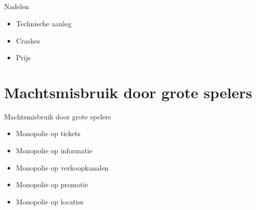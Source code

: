 \documentclass{beamer}
\begin{document}
    \subsection{}
    \begin{frame}{Nadelen}
        \begin{itemize}
            \item Technische aanleg
            \item Crashes
            \item Prijs
        \end{itemize}
    \end{frame}
    
    
    
    

    
\section[Machtsmisbruik]{Machtsmisbruik door grote spelers}
\begin{frame}{Machtsmisbruik door grote spelers}
    \begin{itemize}
        \item Monopolie op tickets
        \item Monopolie op informatie
        \item Monopolie op verkoopkanalen
        \item Monopolie op promotie
        \item Monopolie op locaties
    \end{itemize}
\end{frame}
    
\end{document}
